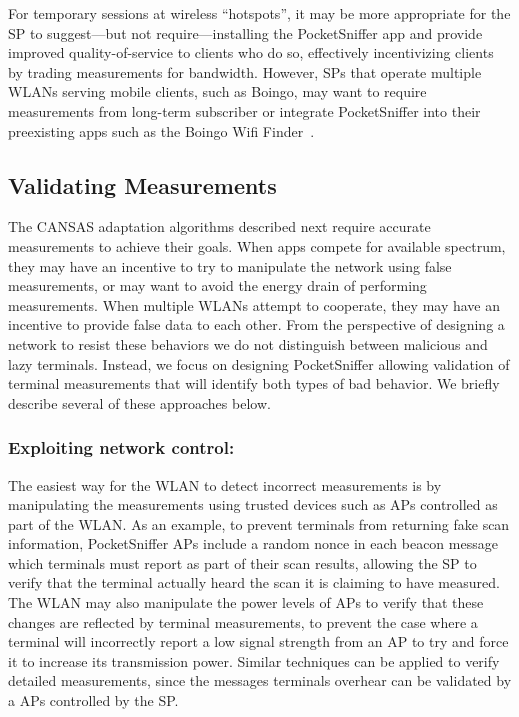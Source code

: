 For temporary sessions at wireless ``hotspots'', it may be more appropriate
for the SP to suggest---but not require---installing the PocketSniffer app
and provide improved quality-of-service to clients who do so, effectively
incentivizing clients by trading measurements for bandwidth. However, SPs
that operate multiple WLANs serving mobile clients, such as Boingo, may want
to require measurements from long-term subscriber or integrate PocketSniffer
into their preexisting apps such as the Boingo Wifi
Finder~\cite{boingo-playstore-url}.

\subsection{Validating Measurements}
\label{subsec-validation}

The CANSAS adaptation algorithms described next require accurate measurements
to achieve their goals. When apps compete for available spectrum, they may
have an incentive to try to manipulate the network using false measurements,
or may want to avoid the energy drain of performing measurements. When
multiple WLANs attempt to cooperate, they may have an incentive to provide
false data to each other. From the perspective of designing a network to
resist these behaviors we do not distinguish between malicious and lazy
terminals. Instead, we focus on designing PocketSniffer allowing validation
of terminal measurements that will identify both types of bad behavior. We
briefly describe several of these approaches below.

\subsubsection{Exploiting network control:\space} The easiest way for the
WLAN to detect incorrect measurements is by manipulating the
measurements using trusted devices such as APs controlled as part of
the WLAN. As an example, to prevent terminals from returning fake scan
information, PocketSniffer APs include a random nonce in each beacon
message which terminals must report as part of their scan results,
allowing the SP to verify that the terminal actually heard the scan it
is claiming to have measured. The WLAN may also manipulate the power
levels of APs to verify that these changes are reflected by terminal
measurements, to prevent the case where a terminal will incorrectly
report a low signal strength from an AP to try and force it to
increase its transmission power. Similar techniques can be applied to
verify detailed measurements, since the messages terminals overhear
can be validated by a APs controlled by the SP.

